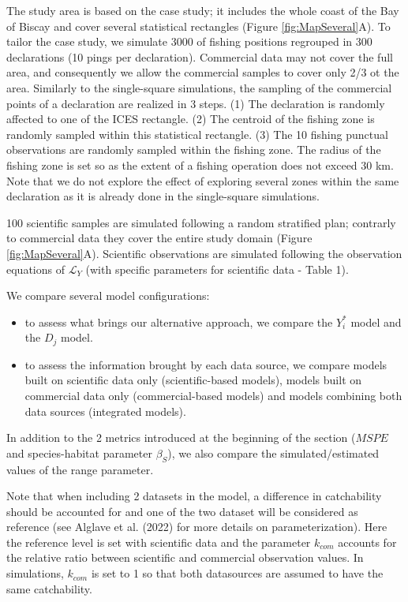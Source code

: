 \documentclass[
  english,
  man,floatsintext]{apa6}
\begin{document}
The study area is based on the case study; it includes the whole coast of the Bay of Biscay and cover several statistical rectangles (Figure \ref{fig:MapSeveral}A). To tailor the case study, we simulate 3000 of fishing positions regrouped in 300 declarations (10 pings per declaration). Commercial data may not cover the full area, and consequently we allow the commercial samples to cover only 2/3 ot the area. Similarly to the single-square simulations, the sampling of the commercial points of a declaration are realized in 3 steps. (1) The declaration is randomly affected to one of the ICES rectangle. (2) The centroid of the fishing zone is randomly sampled within this statistical rectangle. (3) The 10 fishing punctual observations are randomly sampled within the fishing zone. The radius of the fishing zone is set so as the extent of a fishing operation does not exceed 30 km. Note that we do not explore the effect of exploring several zones within the same declaration as it is already done in the single-square simulations.

100 scientific samples are simulated following a random stratified plan; contrarly to commercial data they cover the entire study domain (Figure \ref{fig:MapSeveral}A). Scientific observations are simulated following the observation equations of \(\mathcal{L}_Y\) (with specific parameters for scientific data - Table 1).

We compare several model configurations:

\begin{itemize}
\item
  to assess what brings our alternative approach, we compare the \(Y^*_i\) model and the \(D_j\) model.
\item
  to assess the information brought by each data source, we compare models built on scientific data only (scientific-based models), models built on commercial data only (commercial-based models) and models combining both data sources (integrated models).
\end{itemize}

In addition to the 2 metrics introduced at the beginning of the section (\(MSPE\) and species-habitat parameter \(\beta_S\)), we also compare the simulated/estimated values of the range parameter.

Note that when including 2 datasets in the model, a difference in catchability should be accounted for and one of the two dataset will be considered as reference (see Alglave et al. (2022) for more details on parameterization). Here the reference level is set with scientific data and the parameter \(k_{com}\) accounts for the relative ratio between scientific and commercial observation values. In simulations, \(k_{com}\) is set to 1 so that both datasources are assumed to have the same catchability.
\end{document}
